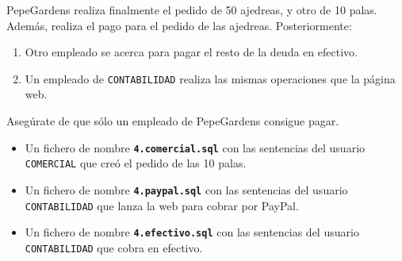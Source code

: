 \begin{homeworkProblem}
\begin{Aviso}
\end{Aviso}

\end{homeworkProblem}

\newpage

\begin{homeworkProblem}
  PepeGardens realiza finalmente el pedido de 50 ajedreas, y otro de 10 palas. Además, realiza el pago para el pedido de las ajedreas. Posteriormente:

  {

    \begin{enumerate}
    \item Otro empleado se acerca para pagar el resto de la deuda en efectivo.
    \item Un empleado de \texttt{CONTABILIDAD} realiza las mismas operaciones que la página web.
    \end{enumerate}
  }
  Asegúrate de que sólo un empleado de PepeGardens consigue pagar.
  \begin{Aviso}
    \begin{itemize}
    \item Un fichero de nombre \texttt{\textbf{4.comercial.sql}} con las sentencias del usuario \texttt{COMERCIAL} que creó el pedido de las 10 palas.
    \item Un fichero de nombre \texttt{\textbf{4.paypal.sql}}  con las sentencias del usuario \texttt{CONTABILIDAD} que lanza la web para cobrar por PayPal.
    \item Un fichero de nombre \texttt{\textbf{4.efectivo.sql}}  con las sentencias del usuario \texttt{CONTABILIDAD} que cobra en efectivo.
    \end{itemize}

\end{Aviso}
\end{homeworkProblem}
